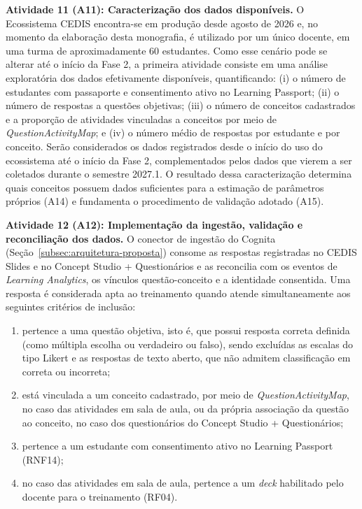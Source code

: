 \textbf{Atividade 11 (A11): Caracterização dos dados disponíveis.} O Ecossistema CEDIS encontra-se em produção desde agosto de 2026 e, no momento da elaboração desta monografia, é utilizado por um único docente, em uma turma de aproximadamente 60 estudantes. Como esse cenário pode se alterar até o início da Fase 2, a primeira atividade consiste em uma análise exploratória dos dados efetivamente disponíveis, quantificando: (i) o número de estudantes com passaporte e consentimento ativo no Learning Passport; (ii) o número de respostas a questões objetivas; (iii) o número de conceitos cadastrados e a proporção de atividades vinculadas a conceitos por meio de \textit{QuestionActivityMap}; e (iv) o número médio de respostas por estudante e por conceito. Serão considerados os dados registrados desde o início do uso do ecossistema até o início da Fase 2, complementados pelos dados que vierem a ser coletados durante o semestre 2027.1. O resultado dessa caracterização determina quais conceitos possuem dados suficientes para a estimação de parâmetros próprios (A14) e fundamenta o procedimento de validação adotado (A15).

\textbf{Atividade 12 (A12): Implementação da ingestão, validação e reconciliação dos dados.} O conector de ingestão do Cognita (Seção~\ref{subsec:arquitetura-proposta}) consome as respostas registradas no CEDIS Slides e no Concept Studio + Questionários e as reconcilia com os eventos de \textit{Learning Analytics}, os vínculos questão-conceito e a identidade consentida. Uma resposta é considerada apta ao treinamento quando atende simultaneamente aos seguintes critérios de inclusão:

\begin{enumerate}
    \item pertence a uma questão objetiva, isto é, que possui resposta correta definida (como múltipla escolha ou verdadeiro ou falso), sendo excluídas as escalas do tipo Likert e as respostas de texto aberto, que não admitem classificação em correta ou incorreta;
    \item está vinculada a um conceito cadastrado, por meio de \textit{QuestionActivityMap}, no caso das atividades em sala de aula, ou da própria associação da questão ao conceito, no caso dos questionários do Concept Studio + Questionários;
    \item pertence a um estudante com consentimento ativo no Learning Passport (RNF14);
    \item no caso das atividades em sala de aula, pertence a um \textit{deck} habilitado pelo docente para o treinamento (RF04).
\end{enumerate}

